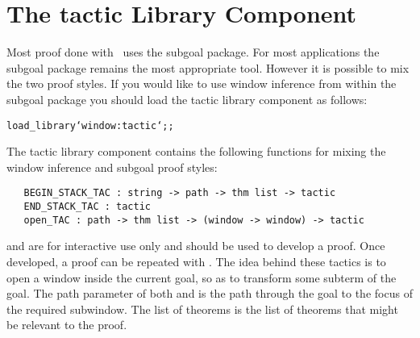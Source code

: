 \section{The tactic Library Component}

Most proof done with \HOL\ uses the subgoal package.
For most applications the subgoal package remains the most appropriate tool.
However it is possible to mix the two proof styles.
If you would like to use window inference from within the subgoal package
you should load the tactic library component as follows:
\begin{hol}\begin{alltt}
	load_library `window:tactic`;;
\end{alltt}\end{hol}

The tactic library component contains the following functions for 
mixing the window inference and subgoal proof styles:
\begin{boxed}\begin{verbatim}
   BEGIN_STACK_TAC : string -> path -> thm list -> tactic
   END_STACK_TAC : tactic
   open_TAC : path -> thm list -> (window -> window) -> tactic
\end{verbatim}\end{boxed}
 and  are for interactive use only and
should be used to develop a proof.
Once developed, a proof can be repeated with .
The idea behind these tactics is to open a window inside the current goal,
so as to transform some subterm of the goal.
The path parameter of both  and  is the path
through the goal to the focus of the required subwindow.
The list of theorems is the list of theorems that might be relevant to
the proof.

